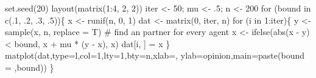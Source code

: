 \documentclass[
  a4paper,
  DIV=11,
  numbers=noendperiod,
  oneside]{scrreprt}
\newenvironment{Shaded}{}{}
\newcommand{\AttributeTok}[1]{\textcolor[rgb]{0.84,0.23,0.29}{#1}}
\newcommand{\CommentTok}[1]{\textcolor[rgb]{0.42,0.45,0.49}{#1}}
\newcommand{\ControlFlowTok}[1]{\textcolor[rgb]{0.84,0.23,0.29}{#1}}
\newcommand{\DecValTok}[1]{\textcolor[rgb]{0.00,0.36,0.77}{#1}}
\newcommand{\FunctionTok}[1]{\textcolor[rgb]{0.44,0.26,0.76}{#1}}
\newcommand{\NormalTok}[1]{\textcolor[rgb]{0.14,0.16,0.18}{#1}}
\newcommand{\OtherTok}[1]{\textcolor[rgb]{0.44,0.26,0.76}{#1}}
\newcommand{\SpecialCharTok}[1]{\textcolor[rgb]{0.00,0.36,0.77}{#1}}
\newcommand{\StringTok}[1]{\textcolor[rgb]{0.01,0.18,0.38}{#1}}
\begin{document}
\begin{Shaded}
\begin{Highlighting}[]
\FunctionTok{set.seed}\NormalTok{(}\DecValTok{20}\NormalTok{)}
\FunctionTok{layout}\NormalTok{(}\FunctionTok{matrix}\NormalTok{(}\DecValTok{1}\SpecialCharTok{:}\DecValTok{4}\NormalTok{, }\DecValTok{2}\NormalTok{, }\DecValTok{2}\NormalTok{))}
\NormalTok{iter }\OtherTok{\textless{}{-}} \DecValTok{50}\NormalTok{; mu }\OtherTok{\textless{}{-}}\NormalTok{ .}\DecValTok{5}\NormalTok{; n }\OtherTok{\textless{}{-}} \DecValTok{200}
\ControlFlowTok{for}\NormalTok{ (bound }\ControlFlowTok{in} \FunctionTok{c}\NormalTok{(.}\DecValTok{1}\NormalTok{, .}\DecValTok{2}\NormalTok{, .}\DecValTok{3}\NormalTok{, .}\DecValTok{5}\NormalTok{))\{}
\NormalTok{  x }\OtherTok{\textless{}{-}} \FunctionTok{runif}\NormalTok{(n, }\DecValTok{0}\NormalTok{, }\DecValTok{1}\NormalTok{)}
\NormalTok{  dat }\OtherTok{\textless{}{-}} \FunctionTok{matrix}\NormalTok{(}\DecValTok{0}\NormalTok{, iter, n)}
  \ControlFlowTok{for}\NormalTok{ (i }\ControlFlowTok{in} \DecValTok{1}\SpecialCharTok{:}\NormalTok{iter)\{}
\NormalTok{    y }\OtherTok{\textless{}{-}} \FunctionTok{sample}\NormalTok{(x, n, }\AttributeTok{replace =}\NormalTok{ T) }\CommentTok{\# find an partner for every agent}
\NormalTok{    x }\OtherTok{\textless{}{-}} \FunctionTok{ifelse}\NormalTok{(}\FunctionTok{abs}\NormalTok{(x }\SpecialCharTok{{-}}\NormalTok{ y) }\SpecialCharTok{\textless{}}\NormalTok{ bound, x }\SpecialCharTok{+}\NormalTok{ mu }\SpecialCharTok{*}\NormalTok{ (y }\SpecialCharTok{{-}}\NormalTok{ x), x)}
\NormalTok{    dat[i, ] }\OtherTok{=}\NormalTok{ x}
\NormalTok{  \}}
  \FunctionTok{matplot}\NormalTok{(dat,}\AttributeTok{type=}\StringTok{\textquotesingle{}l\textquotesingle{}}\NormalTok{,}\AttributeTok{col=}\DecValTok{1}\NormalTok{,}\AttributeTok{lty=}\DecValTok{1}\NormalTok{,}\AttributeTok{bty=}\StringTok{\textquotesingle{}n\textquotesingle{}}\NormalTok{,}\AttributeTok{xlab=}\StringTok{\textquotesingle{}\textquotesingle{}}\NormalTok{,}
          \AttributeTok{ylab=}\StringTok{\textquotesingle{}opinion\textquotesingle{}}\NormalTok{,}\AttributeTok{main=}\FunctionTok{paste}\NormalTok{(}\StringTok{\textquotesingle{}bound = \textquotesingle{}}\NormalTok{,bound))}
\NormalTok{\}}
\end{Highlighting}
\end{Shaded}
\end{document}
